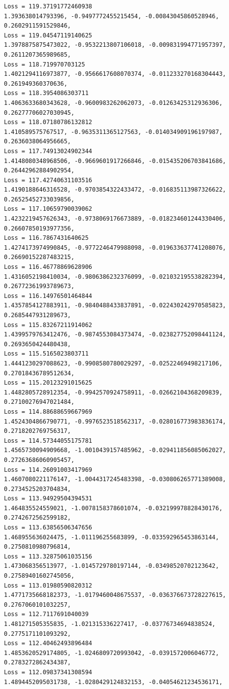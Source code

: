 \documentclass[11pt]{article}
\begin{document}
\begin{Verbatim}[commandchars=\\\{\}]
Loss = 119.37191772460938
1.393638014793396, -0.9497772455215454, -0.00843045860528946,
0.2602911591529846,
Loss = 119.04547119140625
1.3978875875473022, -0.9532213807106018, -0.009831994771957397,
0.2611207365989685,
Loss = 118.719970703125
1.4021294116973877, -0.9566617608070374, -0.011233270168304443,
0.261949360370636,
Loss = 118.3954086303711
1.4063633680343628, -0.9600983262062073, -0.01263425312936306,
0.26277706027030945,
Loss = 118.07180786132812
1.410589575767517, -0.9635311365127563, -0.014034909196197987,
0.2636038064956665,
Loss = 117.74913024902344
1.4148080348968506, -0.9669601917266846, -0.015435206703841686,
0.26442962884902954,
Loss = 117.42740631103516
1.4190188646316528, -0.9703854322433472, -0.016835113987326622,
0.26525452733039856,
Loss = 117.10659790039062
1.4232219457626343, -0.9738069176673889, -0.018234601244330406,
0.26607850193977356,
Loss = 116.7867431640625
1.4274173974990845, -0.9772246479988098, -0.019633637741208076,
0.26690152287483215,
Loss = 116.46778869628906
1.4316052198410034, -0.9806386232376099, -0.021032195538282394,
0.26772361993789673,
Loss = 116.14976501464844
1.4357854127883911, -0.9840488433837891, -0.022430242970585823,
0.2685447931289673,
Loss = 115.83267211914062
1.4399579763412476, -0.9874553084373474, -0.023827752098441124,
0.2693650424480438,
Loss = 115.5165023803711
1.4441230297088623, -0.9908580780029297, -0.02522469498217106,
0.27018436789512634,
Loss = 115.20123291015625
1.4482805728912354, -0.9942570924758911, -0.02662104368209839,
0.27100276947021484,
Loss = 114.88688659667969
1.4524304866790771, -0.9976523518562317, -0.028016773983836174,
0.2718202769756317,
Loss = 114.57344055175781
1.4565730094909668, -1.0010439157485962, -0.029411856085062027,
0.27263686060905457,
Loss = 114.26091003417969
1.4607080221176147, -1.0044317245483398, -0.030806265771389008,
0.2734525203704834,
Loss = 113.94929504394531
1.464835524559021, -1.0078158378601074, -0.032199978828430176,
0.2742672562599182,
Loss = 113.63856506347656
1.468955636024475, -1.011196255683899, -0.033592965453863144,
0.2750810980796814,
Loss = 113.32875061035156
1.473068356513977, -1.0145729780197144, -0.03498520702123642,
0.27589401602745056,
Loss = 113.01980590820312
1.4771735668182373, -1.0179460048675537, -0.036376673728227615,
0.2767060101032257,
Loss = 112.7117691040039
1.481271505355835, -1.021315336227417, -0.03776734694838524, 0.2775171101093292,
Loss = 112.40462493896484
1.4853620529174805, -1.0246809720993042, -0.0391572006046772,
0.2783272862434387,
Loss = 112.09837341308594
1.4894452095031738, -1.0280429124832153, -0.04054621234536171,

\end{Verbatim}
\end{document}
